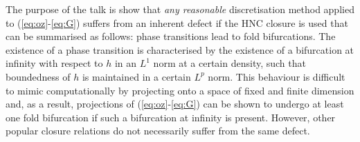 \documentclass{report}
\begin{document}
The purpose of the talk is show that {\em any reasonable} discretisation
method applied to (\ref{eq:oz}-\ref{eq:G}) suffers from an inherent
defect if the HNC closure is used that can be summarised as follows:
phase transitions lead to fold bifurcations. The existence of a phase
transition is characterised by the existence of a bifurcation at infinity
with respect to $h$ in an $L^1$ norm at a certain density, such that
boundedness of $h$ is maintained in a certain $L^p$ norm. This behaviour
is difficult to mimic computationally by projecting onto a space of fixed
and finite dimension and, as a result, projections of
(\ref{eq:oz}-\ref{eq:G}) can be shown to undergo at least one fold
bifurcation if such a bifurcation at infinity is present. However, other
popular closure relations do not necessarily suffer from the same defect.
\end{document}
